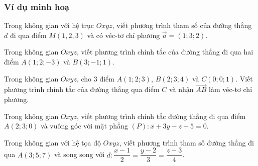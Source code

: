 	\subsubsection{Ví dụ minh hoạ}
	\begin{vd}%
	Trong không gian với hệ trục $Oxyz$, viết phương trình tham số của đường thẳng $d$ đi qua điểm $M(1,2,3)$ và có véc-tơ chỉ phương $\vec{a}=(1;3;2)$.
	\end{vd}
	\begin{vd}%
	Trong không gian $Oxyz$, viết phương trình chính tắc của đường thẳng đi qua hai điểm $A(1;2;-3)$ và $B(3;-1;1)$.
	\end{vd}
	\begin{vd}%
	Trong không gian $Oxyz$, cho $3$ điểm $A(1;2;3)$, $B(2;3;4)$ và $C(0;0;1)$. Viết phương trình chính tắc của đường thẳng qua điểm $C$ và nhận $\overrightarrow{AB}$ làm véc-tơ chỉ phương.
	\end{vd}
	\begin{vd}%
	Trong không gian $Oxyz$, viết phương trình chính tắc đường thẳng đi qua điểm $A(2;3;0)$ và vuông góc với mặt phẳng $(P): x + 3y - z + 5 = 0.$
	\end{vd}
	\begin{vd}%
	Trong không gian với hệ tọa độ $Oxyz$, viết phương trình tham số đường thẳng đi qua $A\left(3;5;7\right)$ và song song với $d:\dfrac{x-1}{2}=\dfrac{y-2}{3}=\dfrac{z-3}{4}$.
	\end{vd}
